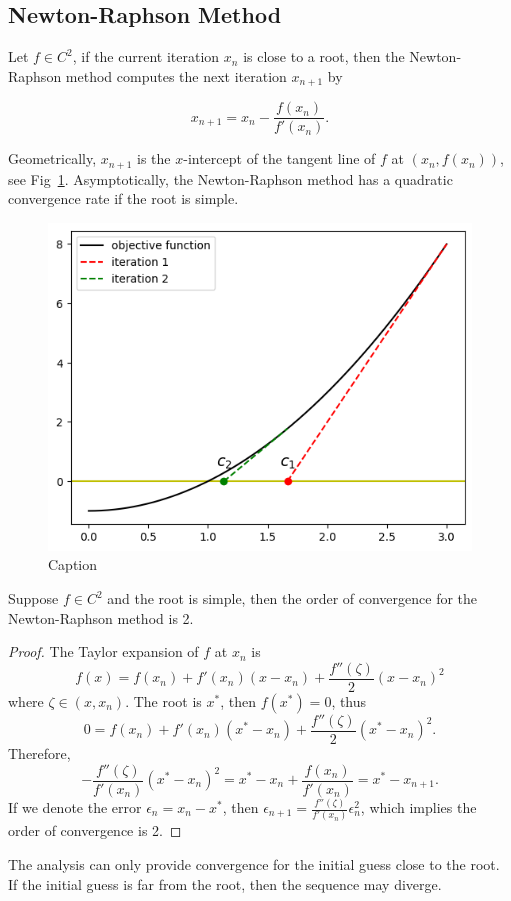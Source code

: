 \subsection{Newton-Raphson Method}
Let $f\in C^2$, if the current iteration $x_{n}$ is close to a root, then the Newton-Raphson method computes the next iteration $x_{n+1}$ by

$$
x_{n+1} = x_n - \frac{f(x_n)}{f'(x_n)}.
$$

Geometrically, $x_{n+1}$ is the $x$-intercept of the tangent line of $f$ at $(x_n, f(x_n))$, see Fig~\ref{FIG: 0-RO-FI-NE-ME}. Asymptotically, the Newton-Raphson method has a quadratic convergence rate if the root is simple.

\begin{figure}[!htb]
    \centering
    \includegraphics[scale=0.6]{Figures/root_finding_img_2.png}
    \caption{Caption}
    \label{FIG: 0-RO-FI-NE-ME}
\end{figure}

\begin{theorem}
Suppose $f\in C^2$ and the root is simple, then the order of convergence for the Newton-Raphson method is 2.
\end{theorem}
\begin{proof}
The Taylor expansion of $f$ at $x_n$ is
$$f(x) = f(x_n) + f'(x_n)(x - x_n) + \frac{f''(\zeta)}{2}(x - x_n)^2$$
where $\zeta\in (x, x_n)$. The root is $x^{\ast}$, then $f(x^{\ast}) = 0$, thus
$$0 = f(x_n) + f'(x_n)(x^{\ast} - x_n) + \frac{f''(\zeta)}{2}(x^{\ast} - x_n)^2.$$
Therefore,
$$
-\frac{f''(\zeta)}{f'(x_n)} (x^{\ast} - x_n)^2= x^{\ast} - x_n + \frac{f(x_n)}{f'(x_n)} = x^{\ast} - x_{n+1}.
$$
If we denote the error $\epsilon_{n} = x_n - x^{\ast}$, then $\epsilon_{n+1} = \frac{f''(\zeta)}{f'(x_n)} \epsilon_{n}^2$, which implies the order of convergence is 2.
\end{proof}
\begin{remark}
    The analysis can only provide convergence for the initial guess close to the root. If the initial guess is far from the root, then the sequence may diverge.
\end{remark}
